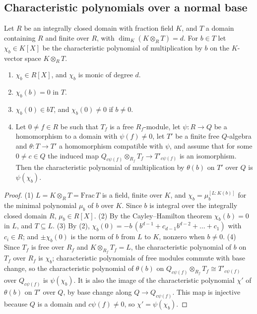 \subsection{Characteristic polynomials over a normal base}\label{subsec:nf-charpoly}

\begin{lemma}\label{lem:nf-charpoly}
\leanok
Let $R$ be an integrally closed domain with fraction field $K$, and $T$ a domain containing $R$ and finite over $R$,
with $\dim_K(K\otimes_RT)=d$. For $b\in T$ let $\chi_b\in K[X]$ be the characteristic polynomial of multiplication by
$b$ on the $K$-vector space $K\otimes_RT$.
\begin{enumerate}
\item $\chi_b\in R[X]$, and $\chi_b$ is monic of degree $d$.
\item $\chi_b(b)=0$ in $T$.
\item $\chi_b(0)\in bT$, and $\chi_b(0)\ne0$ if $b\ne0$.
\item Let $0\ne f\in R$ be such that $T_f$ is a free $R_f$-module, let $\psi\colon R\to Q$ be a homomorphism to a domain
with $\psi(f)\ne0$, let $T'$ be a finite free $Q$-algebra and $\theta\colon T\to T'$ a homomorphism compatible with
$\psi$, and assume that for some $0\ne c\in Q$ the induced map $Q_{c\psi(f)}\otimes_{R_f}T_f\to T'_{c\psi(f)}$ is an
isomorphism. Then the characteristic polynomial of multiplication by $\theta(b)$ on $T'$ over $Q$ is $\psi(\chi_b)$.
\end{enumerate}
\end{lemma}

\begin{proof}
(1) $L=K\otimes_RT=\mathrm{Frac}\,T$ is a field, finite over $K$, and $\chi_b=\mu_b^{[L:K(b)]}$ for the minimal
polynomial $\mu_b$ of $b$ over $K$. Since $b$ is integral over the integrally closed domain $R$, $\mu_b\in R[X]$.
(2) By the Cayley--Hamilton theorem $\chi_b(b)=0$ in $L$, and $T\subseteq L$. (3) By (2),
$\chi_b(0)=-b\,(b^{d-1}+c_{d-1}b^{d-2}+\dots+c_1)$ with $c_i\in R$; and $\pm\chi_b(0)$ is the norm of $b$ from $L$ to
$K$, nonzero when $b\ne0$. (4) Since $T_f$ is free over $R_f$ and $K\otimes_{R_f}T_f=L$, the characteristic polynomial
of $b$ on $T_f$ over $R_f$ is $\chi_b$; characteristic polynomials of free modules commute with base change, so the
characteristic polynomial of $\theta(b)$ on $Q_{c\psi(f)}\otimes_{R_f}T_f\cong T'_{c\psi(f)}$ over $Q_{c\psi(f)}$ is
$\psi(\chi_b)$. It is also the image of the characteristic polynomial $\chi'$ of $\theta(b)$ on $T'$ over $Q$, by base
change along $Q\to Q_{c\psi(f)}$. This map is injective because $Q$ is a domain and $c\psi(f)\ne0$, so
$\chi'=\psi(\chi_b)$.
\end{proof}

